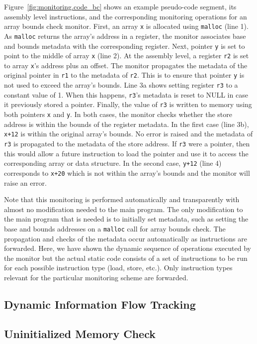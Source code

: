 Figure~\ref{fig:monitoring.code_bc} shows an example pseudo-code segment,
its assembly level instructions, and the corresponding monitoring operations
for an array bounds check monitor. 
First, an array {\tt x} is allocated using {\tt malloc} (line 1). 
As {\tt malloc} returns the array's address in a register, the monitor
associates base and bounds metadata with the corresponding register. 
Next, pointer {\tt y} is set to point to the middle of array {\tt x} (line 2). 
At the assembly level, a register {\tt r2} is set to array {\tt x}'s address plus an offset.
The monitor propagates the metadata of the original pointer in {\tt r1} to the
metadata of {\tt r2}. This is to ensure that pointer {\tt y} is not used to exceed the array's bounds.
Line 3a shows setting register {\tt r3} to a constant value of 1.
When this happens,
{\tt r3}'s metadata is reset to NULL in case it previously stored a
pointer. 
Finally, the value of {\tt r3} is written to memory using both pointers {\tt x} and {\tt y}.
In both cases, the monitor checks whether the store address is within the bounds of the register metadata. In the first case (line 3b), {\tt x+12}
is within the original array's bounds. No error is raised and the metadata of
{\tt r3} is propagated to the metadata of the store address. If {\tt r3} were a
pointer, then this would allow a future instruction to load the pointer and use
it to access the corresponding array or data structure. In the second case,
{\tt y+12} (line 4) corresponds to {\tt x+20} which is not within the array's bounds and
the monitor will raise an error. 

Note that this monitoring is performed automatically and transparently with
almost no modification needed to the main program. The only modification to
the main program that is needed is to initially set metadata, such as setting
the base and bounds addresses on a {\tt malloc} call for array bounds check.
The propagation and checks of the metadata occur automatically as
instructions are forwarded.
Here, we have shown the dynamic sequence of operations executed by the monitor but
the actual static code consists of a set of instructions to be run for each
possible instruction type (load, store, etc.). Only instruction types relevant
for the particular monitoring scheme are forwarded.



\subsection{Dynamic Information Flow Tracking}

\subsection{Uninitialized Memory Check}

